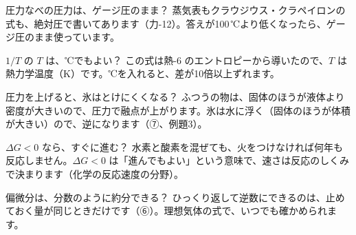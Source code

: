 \begin{tsumazuki}{圧力なべの圧力は、ゲージ圧のまま？}
蒸気表もクラウジウス・クラペイロンの式も、絶対圧で書いてあります（力-12）。答えが100\,℃より低くなったら、ゲージ圧のまま使っています。
\end{tsumazuki}

\begin{tsumazuki}{$1/T$ の $T$ は、℃でもよい？}
この式は熱-6 のエントロピーから導いたので、$T$ は熱力学温度（K）です。℃を入れると、差が10倍以上ずれます。
\end{tsumazuki}

\begin{tsumazuki}{圧力を上げると、氷はとけにくくなる？}
ふつうの物は、固体のほうが液体より密度が大きいので、圧力で融点が上がります。氷は水に浮く（固体のほうが体積が大きい）ので、逆になります（⑦、例題3）。
\end{tsumazuki}

\begin{tsumazuki}{$\Delta G<0$ なら、すぐに進む？}
水素と酸素を混ぜても、火をつけなければ何年も反応しません。$\Delta G<0$ は「進んでもよい」という意味で、速さは反応のしくみで決まります（化学の反応速度の分野）。
\end{tsumazuki}

\begin{tsumazuki}{偏微分は、分数のように約分できる？}
ひっくり返して逆数にできるのは、止めておく量が同じときだけです（⑥）。理想気体の式で、いつでも確かめられます。
\end{tsumazuki}

